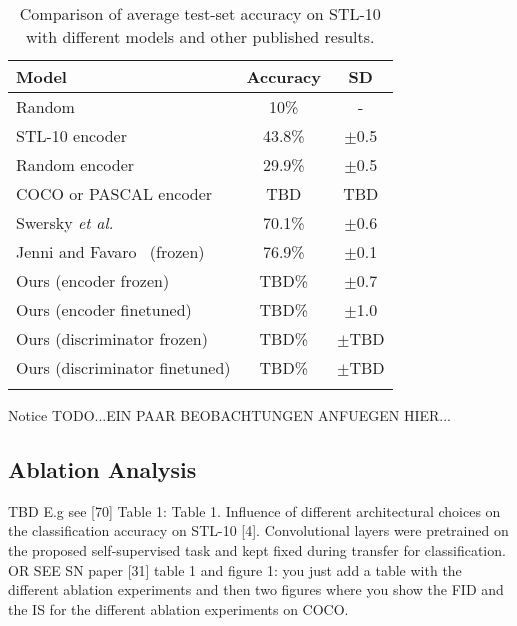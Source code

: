\documentclass[12pt,a4paper]{article}
\begin{document}
\begin{table}[ht!]
\centering
\begin{tabular}{l|c|c}
\Xhline{0.8pt}
\textbf{Model} & \textbf{Accuracy} & \textbf{SD} \\
\hline
Random & 10\% & - \\
STL-10 encoder & 43.8\% & $\pm$0.5 \\ %
\hline
Random encoder & 29.9\% & $\pm$0.5 \\ %
COCO or PASCAL encoder & TBD & TBD    \\
\hline
Swersky \textit{et al.}~\cite{Stl10TlExp2Comp} & 70.1\% & $\pm$0.6 \\
Jenni and Favaro~\cite{SpotArtifacts} (frozen) & 76.9\% & $\pm$0.1 \\
\hline
Ours (encoder frozen) & TBD\%  & $\pm$0.7  \\
Ours (encoder finetuned) & TBD\% & $\pm$1.0  \\
Ours (discriminator frozen) & TBD\%  & $\pm$TBD  \\
Ours (discriminator finetuned) & TBD\%  & $\pm$TBD  \\
\Xhline{0.8pt}
\end{tabular}
\caption{Comparison of average test-set accuracy on STL-10 with different models and other published results.} \label{tab:comparison_stl10}
\end{table}
Notice TODO...EIN PAAR BEOBACHTUNGEN ANFUEGEN HIER...


\subsection{Ablation Analysis}
TBD
E.g see [70] Table 1:
Table 1. Influence of different architectural choices on the classification
accuracy on STL-10 [4]. Convolutional layers were pretrained
on the proposed self-supervised task and kept fixed during
transfer for classification.
OR SEE SN paper [31] table 1 and figure 1: you just add a table with the different ablation experiments and then two figures where you show the FID and the IS for the different ablation experiments on COCO.



\end{document}
